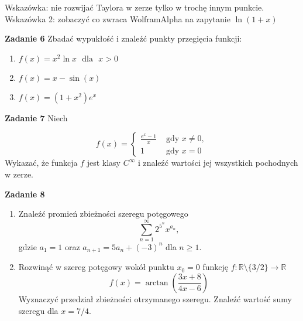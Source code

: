 \documentclass[a4paper,11pt]{article}
\begin{document}
Wskazówka: nie rozwijać Taylora w zerze tylko w trochę innym punkcie. \\
Wskazówka 2: zobaczyć co zwraca WolframAlpha na zapytanie $\ln(1+x)$

\bigskip

\textbf{Zadanie 6} Zbadać wypukłość i znaleźć punkty przegięcia funkcji:

\begin{enumerate}[label=(\alph*)]
    \item $f(x) = x^2\ln x \text{~~dla~~} x > 0$
    \item $f(x) = x - \sin(x)$
    \item $f(x) = (1+x^2)e^x$
\end{enumerate}

\bigskip

\textbf{Zadanie 7} Niech

\[
f(x) = 
\begin{cases}
    \frac{e^x-1}{x} & \text{~gdy~} x\neq0, \\
    1 & \text{~gdy~} x=0
\end{cases}
\]
Wykazać, że funkcja $f$ jest klasy $C^\infty$
i znaleźć wartości jej wszystkich pochodnych w zerze.

\bigskip

\textbf{Zadanie 8} 
\begin{enumerate}[label=(\alph*)]
    \item Znaleźć promień zbieżności szeregu potęgowego
    \[
    \sum_{n=1}^\infty 2^{5^n} x^{a_n},
    \]
    gdzie $a_1 = 1$ oraz $a_{n+1} = 5a_n + (-3)^n$ dla $n\geq1$.
    \item Rozwinąć w szereg potęgowy wokół punktu $x_0 = 0$ funkcję 
    $f:\mathbb{R} \setminus \{3/2\} \to \mathbb{R}$
    \[
    f(x) = \arctan \left( \frac{3x+8}{4x-6} \right)
    \]
    Wyznaczyć przedział zbieżności otrzymanego szeregu. 
    Znaleźć wartość sumy szeregu dla $x = 7/4$.
\end{enumerate}
\end{document}
